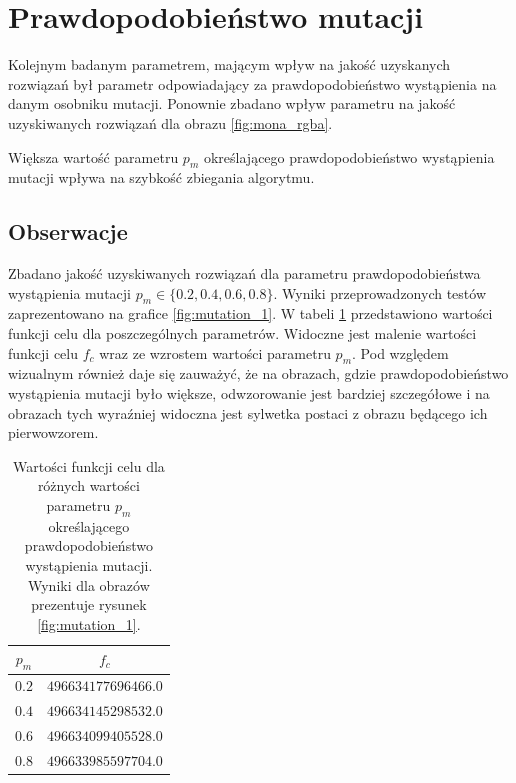 \section{Prawdopodobieństwo mutacji}
Kolejnym badanym parametrem, mającym wpływ na jakość uzyskanych rozwiązań był parametr odpowiadający za prawdopodobieństwo wystąpienia na danym osobniku mutacji. Ponownie zbadano wpływ parametru na jakość uzyskiwanych rozwiązań dla obrazu \ref{fig:mona_rgba}.

\begin{hypothesis}
Większa wartość parametru $p_{m}$ określającego prawdopodobieństwo wystąpienia mutacji wpływa na szybkość zbiegania algorytmu.
\end{hypothesis}

\subsection{Obserwacje}
Zbadano jakość uzyskiwanych rozwiązań dla parametru prawdopodobieństwa wystąpienia mutacji $p_{m} \in \lbrace 0.2, 0.4, 0.6, 0.8 \rbrace$. Wyniki przeprowadzonych testów zaprezentowano na grafice \ref{fig:mutation_1}. W tabeli \ref{tab:mutation_scores} przedstawiono wartości funkcji celu dla poszczególnych parametrów. Widoczne jest malenie wartości funkcji celu $f_{c}$ wraz ze wzrostem wartości parametru $p_{m}$. Pod względem wizualnym również daje się zauważyć, że na obrazach, gdzie prawdopodobieństwo wystąpienia mutacji było większe, odwzorowanie jest bardziej szczegółowe i na obrazach tych wyraźniej widoczna jest sylwetka postaci z obrazu będącego ich pierwowzorem.

\begin{table}[h]
    \centering
    \begin{tabular}{|c|c|}
        \hline
        $p_{m}$ & $f_{c}$  \\
        \hline
        $0.2$ & $496634177696466.0$ \\
        \hline
        $0.4$ & $496634145298532.0$ \\
        \hline
        $0.6$ & $496634099405528.0$ \\
        \hline
        $0.8$ & $496633985597704.0$ \\
        \hline
    \end{tabular}
    \caption{Wartości funkcji celu dla różnych wartości parametru $p_{m}$ określającego prawdopodobieństwo wystąpienia mutacji. Wyniki dla obrazów prezentuje rysunek \ref{fig:mutation_1}.}
    \label{tab:mutation_scores}
\end{table}

